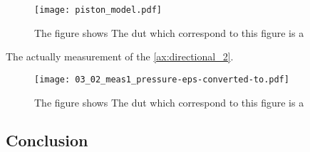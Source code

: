 \begin{figure}[H]
	\centering
	\texttt{[image: piston\_model.pdf]}
	\caption{The figure shows  The \gls{dut} which correspond to this figure is a \citep{seas33}}
		\label{fig:piston_model_of_seas33}
\end{figure}

The actually measurement of the \citep{seas33}  \autoref{ax:directional_2}.

\begin{figure}[H]
	\centering
	\texttt{[image: 03\_02\_meas1\_pressure-eps-converted-to.pdf]}
	\caption{The figure shows  The \gls{dut} which correspond to this figure is a \citep{seas33}}
		\label{fig:piston_model_of_seas33}
\end{figure}

\subsection{Conclusion}